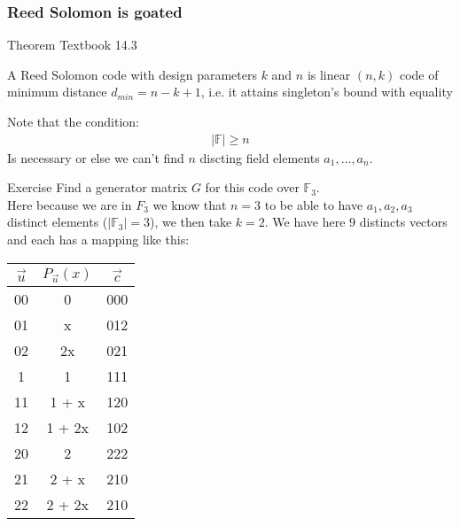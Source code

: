\subsubsection{Reed Solomon is goated}
\begin{parag}{Theorem Textbook 14.3}
    \begin{theoreme}
    A Reed Solomon code with design parameters $k$ and $n$ is linear $\left(n, k\right)$ code of minimum distance $d_{min} = n-k+1$, i.e. it attains singleton's bound with equality
    \end{theoreme}
    \begin{framedremark}
    Note that the condition:
    \begin{align*} \left|\mathbb{F}\right| \geq n \end{align*}
    Is necessary or else we can't find $n$ discting field elements $a_1, \ldots, a_n$.
    \end{framedremark}
\end{parag}



\begin{parag}{Exercise}
    Find a generator matrix $G$ for this code over $\mathbb{F}_3$.\\
    Here because we are in $F_{3}$ we know that $n = 3$ to be able to have $a_1, a_2, a_3$ distinct elements ($\left|\mathbb{F}_3\right| = 3$), we then take $k = 2$. We have here $9$ distincts vectors and each has a mapping like this:

    \begin{center} \begin{tabular}{c|c|c}$\vec{u}$ & $P_{\vec{u}}\left(x\right)$ & $\vec{c}$ \\ \hline \hline 00 & 0 & 000 \\ \hline 01 & x & 012  \\ \hline
     02 & 2x & 021 \\ 1\hline
0 & 1 & 111 \\ \hline
11 & 1 + x & 120 \\ \hline
12  & 1 + 2x & 102 \\ \hline
20  & 2 & 222 \\ \hline
21 & 2 + x & 210  \\\hline
     22 & 2 + 2x & 210 \end{tabular} \end{center} 
\end{parag}

